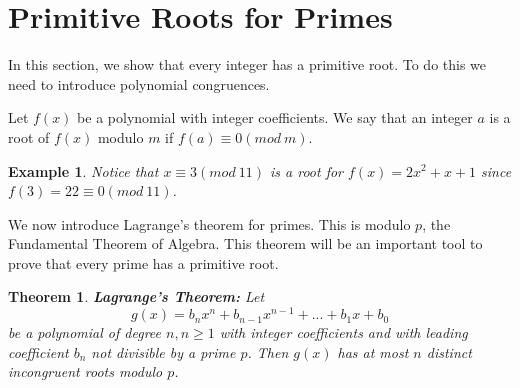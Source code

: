 \documentclass[12pt,letterpaper]{book}
\newtheorem{theorem}{Theorem}
\newtheorem{example}{Example}
\begin{document}
\newpage

\section{Primitive Roots for Primes}
In this section, we show that every integer has a primitive root. To
do this we need to introduce polynomial congruences.
\par Let $f(x)$ be a polynomial with integer coefficients.  We say
that an integer $a$ is a root of $f(x)$ modulo $m$ if $f(a)\equiv 0
(mod\ m)$.

\begin{example}
Notice that $x\equiv 3 (mod\ 11)$ is a root for $f(x)=2x^2+x+1$
since $f(3)=22\equiv 0(mod \ 11)$.
\end{example}

We now introduce Lagrange's theorem for primes.  This is modulo $p$,
the Fundamental Theorem of Algebra.  This theorem will be an
important tool to prove that every prime has a primitive root.
\begin{theorem}\textbf{Lagrange's Theorem:}
Let
\begin{equation*}
g(x)=b_nx^n+b_{n-1}x^{n-1}+...+b_1x+b_0
\end{equation*}
be a polynomial of degree $n, n\geq 1$ with integer coefficients and
with leading coefficient $b_n$ not divisible by a prime $p$.  Then
$g(x)$ has at most $n$ distinct incongruent roots modulo $p$.
\end{theorem}
\end{document}
